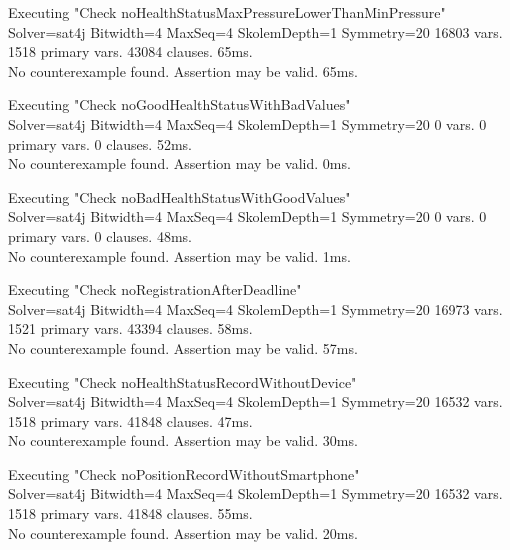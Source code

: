    \vspace{1cm}

   Executing "Check noHealthStatusMaxPressureLowerThanMinPressure" \\ \noindent
      Solver=sat4j Bitwidth=4 MaxSeq=4 SkolemDepth=1 Symmetry=20
      16803 vars. 1518 primary vars. 43084 clauses. 65ms. \\ \noindent
      No counterexample found. Assertion may be valid. 65ms.

   \vspace{1cm}

   Executing "Check noGoodHealthStatusWithBadValues" \\ \noindent
      Solver=sat4j Bitwidth=4 MaxSeq=4 SkolemDepth=1 Symmetry=20
      0 vars. 0 primary vars. 0 clauses. 52ms. \\ \noindent
      No counterexample found. Assertion may be valid. 0ms.

   \vspace{1cm}

   Executing "Check noBadHealthStatusWithGoodValues" \\ \noindent
      Solver=sat4j Bitwidth=4 MaxSeq=4 SkolemDepth=1 Symmetry=20
      0 vars. 0 primary vars. 0 clauses. 48ms. \\ \noindent
      No counterexample found. Assertion may be valid. 1ms.

   \vspace{1cm}

   Executing "Check noRegistrationAfterDeadline" \\ \noindent
      Solver=sat4j Bitwidth=4 MaxSeq=4 SkolemDepth=1 Symmetry=20
      16973 vars. 1521 primary vars. 43394 clauses. 58ms. \\ \noindent
      No counterexample found. Assertion may be valid. 57ms.

   \vspace{1cm}

   Executing "Check noHealthStatusRecordWithoutDevice" \\ \noindent
      Solver=sat4j Bitwidth=4 MaxSeq=4 SkolemDepth=1 Symmetry=20
      16532 vars. 1518 primary vars. 41848 clauses. 47ms. \\ \noindent
      No counterexample found. Assertion may be valid. 30ms.

   \vspace{1cm}

   Executing "Check noPositionRecordWithoutSmartphone" \\ \noindent
      Solver=sat4j Bitwidth=4 MaxSeq=4 SkolemDepth=1 Symmetry=20
      16532 vars. 1518 primary vars. 41848 clauses. 55ms. \\ \noindent
      No counterexample found. Assertion may be valid. 20ms.

